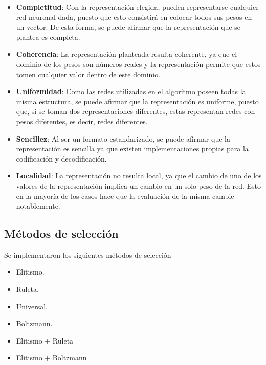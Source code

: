 \documentclass{article}
\begin{document}
\begin{itemize}
  \item \textbf{Completitud}: Con la representación elegida, pueden representarse cualquier red neuronal dada, puesto que esto
  consistirá en colocar todos sus pesos en un vector. De esta forma, se puede afirmar que la representación que se plantea es completa.

  \item \textbf{Coherencia}: La representación planteada resulta coherente, ya que el dominio de los pesos son números reales y la 
  representación permite que estos tomen cualquier valor dentro de este dominio.
  
  \item \textbf{Uniformidad}: Como las redes utilizadas en el algoritmo poseen todas la misma estructura, se puede afirmar
  que la representación es uniforme, puesto que, si se toman dos representaciones diferentes, estas representan redes
  con pesos diferentes, es decir, redes diferentes.
  
  \item \textbf{Sencillez}: Al ser un formato estandarizado, se puede afirmar que la representación es sencilla ya que existen 
  implementaciones propias para la codificación y decodificación.
  
  \item \textbf{Localidad}: La representación no resulta local, ya que el cambio de uno de los valores de la representación implica un cambio en un solo peso de la red. Esto en la mayoría de los casos hace que la evaluación de la misma cambie notablemente.
  
\end{itemize}


\subsection{Métodos de selección}
Se implementaron los siguientes métodos de selección

\begin{itemize}
       \item Elitismo.
       \item Ruleta.
       \item Universal.
       \item Boltzmann.
       \item Elitismo + Ruleta
       \item Elitismo + Boltzmann
\end{itemize}
\end{document}
